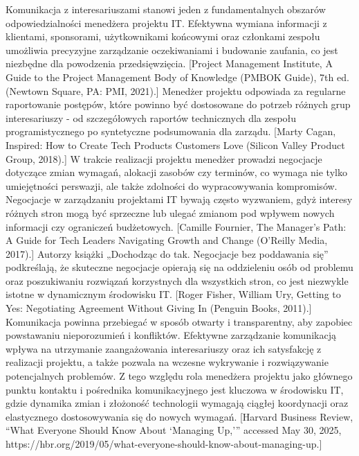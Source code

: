 Komunikacja z interesariuszami stanowi jeden z fundamentalnych obszarów odpowiedzialności menedżera projektu IT. Efektywna wymiana informacji z klientami, sponsorami, użytkownikami końcowymi oraz członkami zespołu umożliwia precyzyjne zarządzanie oczekiwaniami i budowanie zaufania, co jest niezbędne dla powodzenia przedsięwzięcia. [Project Management Institute, A Guide to the Project Management Body of Knowledge (PMBOK Guide), 7th ed. (Newtown Square, PA: PMI, 2021).] Menedżer projektu odpowiada za regularne raportowanie postępów, które powinno być dostosowane do potrzeb różnych grup interesariuszy - od szczegółowych raportów technicznych dla zespołu programistycznego po syntetyczne podsumowania dla zarządu. [Marty Cagan, Inspired: How to Create Tech Products Customers Love (Silicon Valley Product Group, 2018).] W trakcie realizacji projektu menedżer prowadzi negocjacje dotyczące zmian wymagań, alokacji zasobów czy terminów, co wymaga nie tylko umiejętności perswazji, ale także zdolności do wypracowywania kompromisów. Negocjacje w zarządzaniu projektami IT bywają często wyzwaniem, gdyż interesy różnych stron mogą być sprzeczne lub ulegać zmianom pod wpływem nowych informacji czy ograniczeń budżetowych. [Camille Fournier, The Manager's Path: A Guide for Tech Leaders Navigating Growth and Change (O’Reilly Media, 2017).] Autorzy książki „Dochodząc do tak. Negocjacje bez poddawania się” podkreślają, że skuteczne negocjacje opierają się na oddzieleniu osób od problemu oraz poszukiwaniu rozwiązań korzystnych dla wszystkich stron, co jest niezwykle istotne w dynamicznym środowisku IT. [Roger Fisher, William Ury, Getting to Yes: Negotiating Agreement Without Giving In (Penguin Books, 2011).] Komunikacja powinna przebiegać w sposób otwarty i transparentny, aby zapobiec powstawaniu nieporozumień i konfliktów. Efektywne zarządzanie komunikacją wpływa na utrzymanie zaangażowania interesariuszy oraz ich satysfakcję z realizacji projektu, a także pozwala na wczesne wykrywanie i rozwiązywanie potencjalnych problemów. Z tego względu rola menedżera projektu jako głównego punktu kontaktu i pośrednika komunikacyjnego jest kluczowa w środowisku IT, gdzie dynamika zmian i złożoność technologii wymagają ciągłej koordynacji oraz elastycznego dostosowywania się do nowych wymagań. [Harvard Business Review, “What Everyone Should Know About ‘Managing Up,’” accessed May 30, 2025, https://hbr.org/2019/05/what-everyone-should-know-about-managing-up.]
